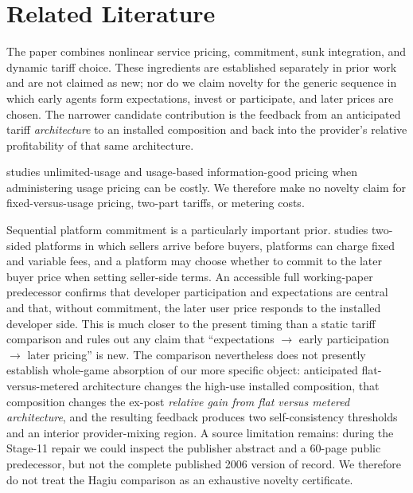 \section{Related Literature}\label{sec:literature}

The paper combines nonlinear service pricing, commitment, sunk integration, and dynamic tariff choice. These ingredients are established separately in prior work and are not claimed as new; nor do we claim novelty for the generic sequence in which early agents form expectations, invest or participate, and later prices are chosen. The narrower candidate contribution is the feedback from an anticipated tariff \emph{architecture} to an installed composition and back into the provider's relative profitability of that same architecture.

\citet{sundararajan2004} studies unlimited-usage and usage-based information-good pricing when administering usage pricing can be costly. We therefore make no novelty claim for fixed-versus-usage pricing, two-part tariffs, or metering costs.

Sequential platform commitment is a particularly important prior. \citet{hagiu2006} studies two-sided platforms in which sellers arrive before buyers, platforms can charge fixed and variable fees, and a platform may choose whether to commit to the later buyer price when setting seller-side terms. An accessible full working-paper predecessor confirms that developer participation and expectations are central and that, without commitment, the later user price responds to the installed developer side. This is much closer to the present timing than a static tariff comparison and rules out any claim that ``expectations $\rightarrow$ early participation $\rightarrow$ later pricing'' is new. The comparison nevertheless does not presently establish whole-game absorption of our more specific object: anticipated flat-versus-metered architecture changes the high-use installed composition, that composition changes the ex-post \emph{relative gain from flat versus metered architecture}, and the resulting feedback produces two self-consistency thresholds and an interior provider-mixing region. A source limitation remains: during the Stage-11 repair we could inspect the publisher abstract and a 60-page public predecessor, but not the complete published 2006 version of record. We therefore do not treat the Hagiu comparison as an exhaustive novelty certificate.

